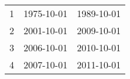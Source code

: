 % 
\begin{tabular}{ccc}
  \hline
  \hline
1 & 1975-10-01 & 1989-10-01 \\ 
  2 & 2001-10-01 & 2009-10-01 \\ 
  3 & 2006-10-01 & 2010-10-01 \\ 
  4 & 2007-10-01 & 2011-10-01 \\ 
   \hline
\end{tabular}
